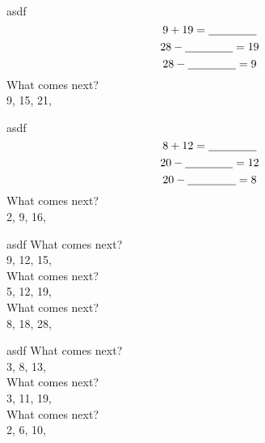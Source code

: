 \documentclass[letter, grid,frame,backs]{flashcards}
\begin{document}
\begin{flashcard}{asdf}
\Huge
\center
\vspace*{-0.8in}
    \[
9 + 19 = \underline{\hspace{1.5cm}} 
\]
\[
28 - \underline{\hspace{1.5cm}} = 19
\]
\[
28 - \underline{\hspace{1.5cm}} = 9
\]What comes next? \\
\vspace*{-0.3in}
9, 15, 21, \underline{\hspace{1.5cm}} \\

\end{flashcard}
\begin{flashcard}{asdf}
\Huge
\center
\vspace*{-0.8in}
    \[
8 + 12 = \underline{\hspace{1.5cm}} 
\]
\[
20 - \underline{\hspace{1.5cm}} = 12
\]
\[
20 - \underline{\hspace{1.5cm}} = 8
\]What comes next? \\
\vspace*{-0.3in}
2, 9, 16, \underline{\hspace{1.5cm}} \\

\end{flashcard}
\begin{flashcard}{asdf}
\Huge
\center
\vspace*{-0.8in}
What comes next? \\
\vspace*{-0.3in}
9, 12, 15, \underline{\hspace{1.5cm}} \\
What comes next? \\
\vspace*{-0.3in}
5, 12, 19, \underline{\hspace{1.5cm}} \\
What comes next? \\
\vspace*{-0.3in}
8, 18, 28, \underline{\hspace{1.5cm}} \\

\end{flashcard}
\begin{flashcard}{asdf}
\Huge
\center
\vspace*{-0.8in}
What comes next? \\
\vspace*{-0.3in}
3, 8, 13, \underline{\hspace{1.5cm}} \\
What comes next? \\
\vspace*{-0.3in}
3, 11, 19, \underline{\hspace{1.5cm}} \\
What comes next? \\
\vspace*{-0.3in}
2, 6, 10, \underline{\hspace{1.5cm}} \\

\end{flashcard}
\end{document}
